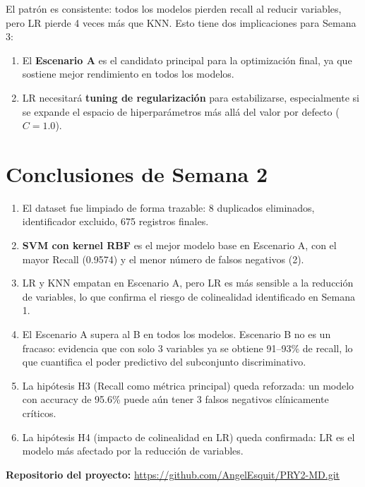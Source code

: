 \documentclass[11pt,a4paper]{article}
\begin{document}
El patrón es consistente: todos los modelos pierden recall al reducir variables, pero LR pierde 4 veces más que KNN. Esto tiene dos implicaciones para Semana 3:

\begin{enumerate}[leftmargin=1.4cm]
\item El \textbf{Escenario A} es el candidato principal para la optimización final, ya que sostiene mejor rendimiento en todos los modelos.
\item LR necesitará \textbf{tuning de regularización} para estabilizarse, especialmente si se expande el espacio de hiperparámetros más allá del valor por defecto ($C=1.0$).
\end{enumerate}

\section{Conclusiones de Semana 2}

\begin{enumerate}[leftmargin=1.4cm]
\item El dataset fue limpiado de forma trazable: 8 duplicados eliminados, identificador excluido, 675 registros finales.
\item \textbf{SVM con kernel RBF} es el mejor modelo base en Escenario A, con el mayor Recall (0.9574) y el menor número de falsos negativos (2).
\item LR y KNN empatan en Escenario A, pero LR es más sensible a la reducción de variables, lo que confirma el riesgo de colinealidad identificado en Semana 1.
\item El Escenario A supera al B en todos los modelos. Escenario B no es un fracaso: evidencia que con solo 3 variables ya se obtiene 91--93\% de recall, lo que cuantifica el poder predictivo del subconjunto discriminativo.
\item La hipótesis H3 (Recall como métrica principal) queda reforzada: un modelo con accuracy de 95.6\% puede aún tener 3 falsos negativos clínicamente críticos.
\item La hipótesis H4 (impacto de colinealidad en LR) queda confirmada: LR es el modelo más afectado por la reducción de variables.
\end{enumerate}

\vspace{1em}
\noindent\textbf{Repositorio del proyecto:}
\url{https://github.com/AngelEsquit/PRY2-MD.git}
\end{document}
